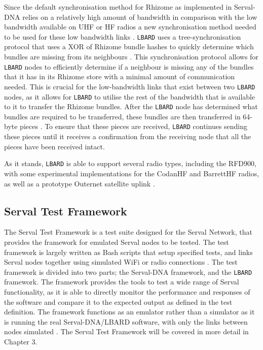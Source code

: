 Since the default synchronisation method for Rhizome as implemented in Serval-DNA relies on a relatively high amount of bandwidth in comparison with the low bandwidth available on UHF or HF radios a new synchronisation method needed to be used for these low bandwidth links \parencite{productizingServalMesh}.
\texttt{LBARD} uses a tree-synchronisation protocol that uses a XOR of Rhizome bundle hashes to quickly determine which bundles are missing from its neighbours \parencite{lbardDocumentation}.
This synchronisation protocol allows for \texttt{LBARD} nodes to efficiently determine if a neighbour is missing any of the bundles that it has in its Rhizome store with a minimal amount of communication needed.
This is crucial for the low-bandwidth links that exist between two \texttt{LBARD} nodes, as it allows for \texttt{LBARD} to utilise the rest of the bandwidth that is available to it to transfer the Rhizome bundles.
After the \texttt{LBARD} node has determined what bundles are required to be transferred, these bundles are then transferred in 64-byte pieces \parencite{lbardDocumentation}.
To ensure that these pieces are received, \texttt{LBARD} continues sending these pieces until it receives a confirmation from the receiving node that all the pieces have been received intact.

As it stands, \texttt{LBARD} is able to support several radio types, including the RFD900, with some experimental implementations for the CodanHF and BarrettHF radios, as well as a prototype Outernet satellite uplink \parencite{lbardDocumentation}.

\subsection{Serval Test Framework}
The Serval Test Framework is a test suite designed for the Serval Network, that provides the framework for emulated Serval nodes to be tested.
The test framework is largely written as Bash scripts that setup specified tests, and links Serval nodes together using simulated WiFi or radio connections \parencite{servalTestDocumentation}.
The test framework is divided into two parts; the Serval-DNA framework, and the \texttt{LBARD} framework.
The framework provides the tools to test a wide range of Serval functionality, as it is able to directly monitor the performance and responses of the software and compare it to the expected output as defined in the test definition.
The framework functions as an emulator rather than a simulator as it is running the real Serval-DNA/LBARD software, with only the links between nodes simulated \parencite{servalTestDocumentation}.
The Serval Test Framework will be covered in more detail in Chapter 3.

